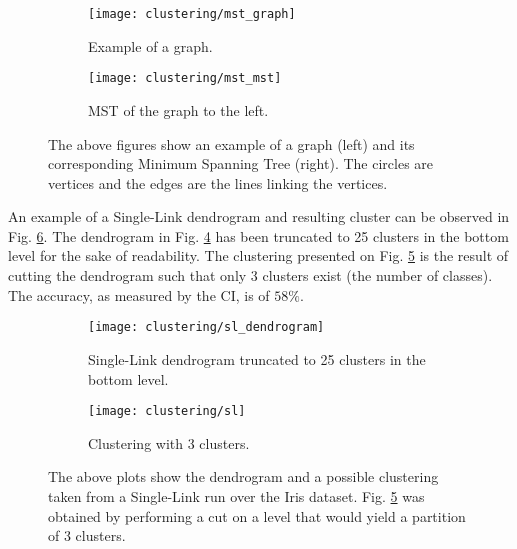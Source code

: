 \begin{figure}[!ht]
    \centering
    \begin{subfigure}[b]{0.3\textwidth}
        \centering
        \texttt{[image: clustering/mst\_graph]}
        \caption{Example of a graph.}
        \label{fig:graph}
    \end{subfigure}
    \hspace{30pt}
    \begin{subfigure}[b]{0.3\textwidth}
        \centering
        \texttt{[image: clustering/mst\_mst]}
        \caption{MST of the graph to the left.}
        \label{fig:graph mst}
    \end{subfigure}

    \caption{The above figures show an example of a graph (left) and its corresponding Minimum Spanning Tree (right). The circles are vertices and the edges are the lines linking the vertices.}
    \label{fig:mst example}
\end{figure}

An example of a Single-Link dendrogram and resulting cluster can be observed in Fig. \ref{fig:sl plots}.
The dendrogram in Fig. \ref{fig:sl dendrogram} has been truncated to 25 clusters in the bottom level for the sake of readability.
The clustering presented on Fig. \ref{fig:sl clustering} is the result of cutting the dendrogram such that only 3 clusters exist (the number of classes).
The accuracy, as measured by the CI, is of $58\%$.

\begin{figure}[!ht]
    \centering
    \begin{subfigure}[b]{0.45\textwidth}
        \centering
        \texttt{[image: clustering/sl\_dendrogram]}
        \caption{Single-Link dendrogram truncated to 25 clusters in the bottom level.}
        \label{fig:sl dendrogram}
    \end{subfigure}
    \begin{subfigure}[b]{0.45\textwidth}
        \centering
        \texttt{[image: clustering/sl]}
        \caption{Clustering with 3 clusters.}
        \label{fig:sl clustering}
    \end{subfigure}

    \caption{The above plots show the dendrogram and a possible clustering taken from a Single-Link run over the Iris dataset. Fig. \ref{fig:sl clustering} was obtained by performing a cut on a level that would yield a partition of 3 clusters.}
    \label{fig:sl plots}
\end{figure}





